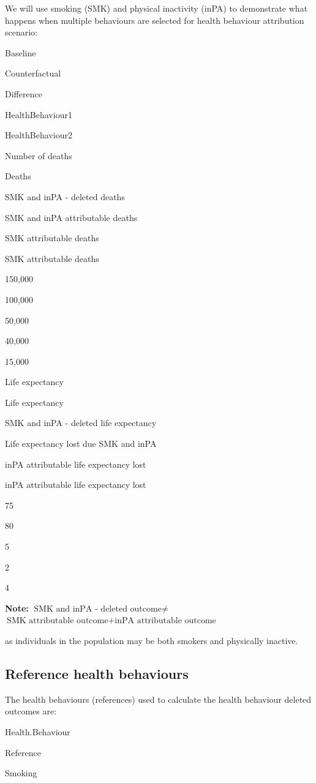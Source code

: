 \documentclass[]{book}
\begin{document}
We will use smoking (SMK) and physical inactivity (inPA) to demonstrate
what happens when multiple behaviours are selected for health behaviour
attribution scenario:

Baseline

Counterfactual

Difference

HealthBehaviour1

HealthBehaviour2

Number of deaths

Deaths

SMK and inPA - deleted deaths

SMK and inPA attributable deaths

SMK attributable deaths

SMK attributable deaths

150,000

100,000

50,000

40,000

15,000

Life expectancy

Life expectancy

SMK and inPA - deleted life expectancy

Life expectancy lost due SMK and inPA

inPA attributable life expectancy lost

inPA attributable life expectancy lost

75

80

5

2

4

\textbf{Note:} \(\text{SMK and inPA - deleted outcome} \neq\)
\(\text{SMK attributable outcome} + \text{inPA attributable outcome}\)

as individuals in the population may be both smokers and physically
inactive.

\subsection{Reference health
behaviours}\label{reference-health-behaviours}

The health behaviours (references) used to calculate the health
behaviour deleted outcomes are:

Health.Behaviour

Reference

Smoking
\end{document}
